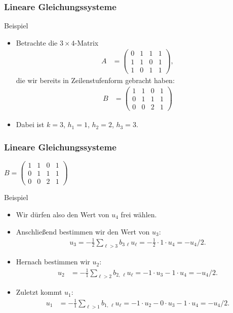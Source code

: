 \documentclass{beamer}
\renewcommand{\ae}{\"a}
\newcommand{\ue}{\"u}
\newcommand{\mytitle}{Lineare Gleichungssysteme}
\begin{document}
\begin{frame}\frametitle{\mytitle}
	\begin{block}{Beispiel}
	\begin{itemize}
		\item Betrachte die $3\times 4$-Matrix
			\begin{align*}
				A&=\begin{pmatrix}
					0&1&1&1\\1&1&0&1\\1&0&1&1
				\end{pmatrix},
			\end{align*}
		die wir bereits in Zeilenstufenform gebracht haben:
			\begin{align*}
				B&=\begin{pmatrix}
					1&1&0&1\\0&1&1&1\\0&0&2&1
				\end{pmatrix}
			\end{align*}
		\item Dabei ist $k=3$, $h_1=1$, $h_2=2$, $h_3=3$.
	\end{itemize}
	\end{block}
\end{frame}

\begin{frame}\frametitle{\mytitle}
	\vspace{-6mm}
	\hfill$B=\begin{pmatrix} 1&1&0&1\\0&1&1&1\\0&0&2&1 \end{pmatrix}$
	\begin{block}{Beispiel}
	\begin{itemize}
		\item Wir d\ue rfen also den Wert von $u_4$ frei w\ae hlen.
		\item Anschlie\ss end bestimmen wir den Wert von $u_3$:
			\begin{align*}
				u_3=-\frac{1}{2}\sum_{\ell>3}b_{3\,\ell}u_\ell=-\frac{1}{2}\cdot 1\cdot u_4=-u_4/2.
			\end{align*}
		\item Hernach bestimmen wir $u_2$:
			\begin{align*}
				u_2&=-\frac11\sum_{\ell>2}b_{2,\,\ell} u_\ell
				=-1\cdot u_3-1\cdot u_4=-u_4/2.
			\end{align*}
		\item Zuletzt kommt $u_1$:
			\begin{align*}
				u_1&=-\frac{1}{1}\sum_{\ell>1}b_{1,\,\ell}u_\ell=-1\cdot u_2-0\cdot u_3-1\cdot u_4=-u_4/2.
			\end{align*}
	\end{itemize}
	\end{block}
\end{frame}
\end{document}

